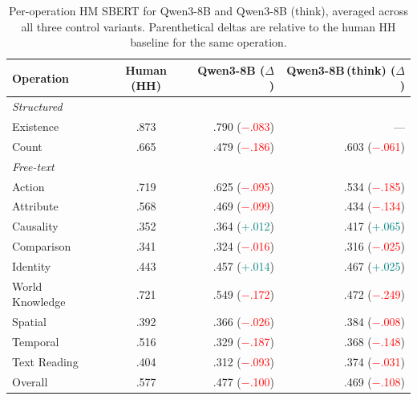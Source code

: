\begin{table}[t]
\small\centering
\setlength{\tabcolsep}{4pt}
\caption{Per-operation HM SBERT for Qwen3-8B and Qwen3-8B (think), averaged across all three control variants. Parenthetical deltas are relative to the human HH baseline for the same operation.}
\label{tab:qwen3_op_breakdown}
\begin{tabular}{lcrr}
\toprule
\textbf{Operation} & \textbf{Human (HH)} & \textbf{Qwen3-8B ($\Delta$)} & \textbf{Qwen3-8B\,(think) ($\Delta$)} \\
\midrule
\multicolumn{4}{l}{\textit{Structured}} \\
\quad Existence & .873 & .790 \small(\textcolor{red}{$-$.083}) & --- \\
\quad Count & .665 & .479 \small(\textcolor{red}{$-$.186}) & .603 \small(\textcolor{red}{$-$.061}) \\
\midrule
\multicolumn{4}{l}{\textit{Free-text}} \\
\quad Action & .719 & .625 \small(\textcolor{red}{$-$.095}) & .534 \small(\textcolor{red}{$-$.185}) \\
\quad Attribute & .568 & .469 \small(\textcolor{red}{$-$.099}) & .434 \small(\textcolor{red}{$-$.134}) \\
\quad Causality & .352 & .364 \small(\textcolor{teal}{+.012}) & .417 \small(\textcolor{teal}{+.065}) \\
\quad Comparison & .341 & .324 \small(\textcolor{red}{$-$.016}) & .316 \small(\textcolor{red}{$-$.025}) \\
\quad Identity & .443 & .457 \small(\textcolor{teal}{+.014}) & .467 \small(\textcolor{teal}{+.025}) \\
\quad World Knowledge & .721 & .549 \small(\textcolor{red}{$-$.172}) & .472 \small(\textcolor{red}{$-$.249}) \\
\quad Spatial & .392 & .366 \small(\textcolor{red}{$-$.026}) & .384 \small(\textcolor{red}{$-$.008}) \\
\quad Temporal & .516 & .329 \small(\textcolor{red}{$-$.187}) & .368 \small(\textcolor{red}{$-$.148}) \\
\quad Text Reading & .404 & .312 \small(\textcolor{red}{$-$.093}) & .374 \small(\textcolor{red}{$-$.031}) \\
\midrule
Overall & .577 & .477 \small(\textcolor{red}{$-$.100}) & .469 \small(\textcolor{red}{$-$.108}) \\
\bottomrule
\end{tabular}
\end{table}
